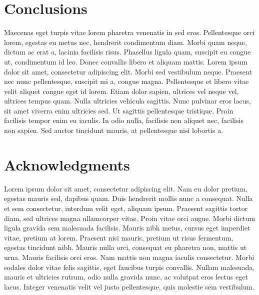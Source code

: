 \documentclass[twocolumn]{article}
\begin{document}
\section{Conclusions}

Maecenas eget turpis vitae lorem pharetra venenatis in sed eros. Pellentesque
orci lorem, egestas eu metus nec, hendrerit condimentum diam. Morbi quam neque,
dictum ac erat a, lacinia facilisis risus. Phasellus ligula quam, suscipit eu
congue ut, condimentum id leo. Donec convallis libero et aliquam mattis. Lorem
ipsum dolor sit amet, consectetur adipiscing elit. Morbi sed vestibulum neque.
Praesent nec nunc pellentesque, suscipit mi a, congue magna. Pellentesque et
libero vitae velit aliquet congue eget id lorem. Etiam dolor sapien, ultrices
vel neque vel, ultrices tempus quam. Nulla ultricies vehicula sagittis. Nunc
pulvinar eros lacus, sit amet viverra enim ultricies sed. Ut sagittis
pellentesque tristique. Proin facilisis tempor enim eu iaculis. In odio nulla,
facilisis non aliquet nec, facilisis non sapien. Sed auctor tincidunt mauris,
at pellentesque nisi lobortis a.

\section{Acknowledgments}

Lorem ipsum dolor sit amet, consectetur adipiscing elit. Nam eu dolor pretium,
egestas mauris sed, dapibus quam. Duis hendrerit mollis nunc a consequat. Nulla
et sem consectetur, interdum velit eget, aliquam ipsum. Praesent sagittis
tortor diam, sed ultrices magna ullamcorper vitae. Proin vitae orci augue.
Morbi dictum ligula gravida sem malesuada facilisis. Mauris nibh metus, cursus
eget imperdiet vitae, pretium at lorem. Praesent nisi mauris, pretium ut risus
fermentum, egestas tincidunt nibh. Mauris nulla orci, consequat eu pharetra
non, mattis ut urna. Mauris facilisis orci eros. Nam mattis non magna iaculis
consectetur. Morbi sodales dolor vitae felis sagittis, eget faucibus turpis
convallis. Nullam malesuada, mauris et ultricies rutrum, odio nulla gravida
nunc, ac volutpat eros lectus eget lacus. Integer venenatis velit vel justo
pellentesque, quis molestie sem vestibulum.



\end{document}
